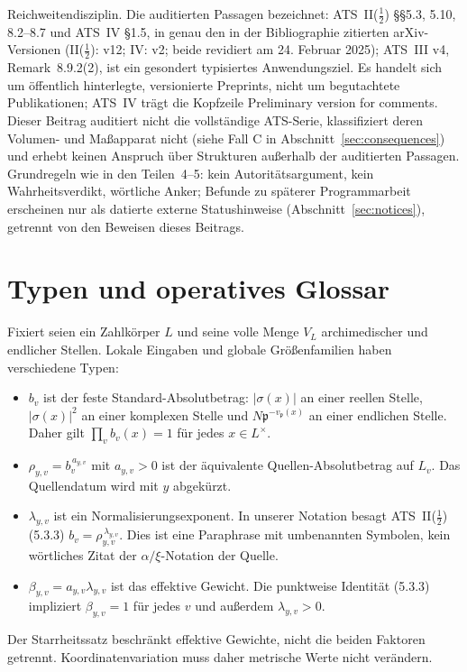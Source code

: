 \documentclass[11pt,a4paper]{article}
\theoremstyle{definition}
\theoremstyle{remark}
\begin{document}
Reichweitendisziplin. \glqq Die auditierten Passagen\grqq{} bezeichnet: ATS~II($\tfrac12$) \S\S5.3, 5.10, 8.2--8.7 und ATS~IV \S1.5, in genau den in der
Bibliographie zitierten arXiv-Versionen (II($\tfrac12$): v12; IV: v2; beide
revidiert am 24. Februar 2025); ATS~III v4, Remark~8.9.2(2), ist ein
gesondert typisiertes Anwendungsziel. Es handelt sich um öffentlich hinterlegte,
versionierte Preprints, nicht um begutachtete Publikationen; ATS~IV trägt die
Kopfzeile \glqq Preliminary version for comments\grqq{}. Dieser Beitrag auditiert nicht
die vollständige ATS-Serie, klassifiziert deren Volumen- und Maßapparat nicht
(siehe Fall C in Abschnitt~\ref{sec:consequences}) und erhebt keinen Anspruch
über Strukturen außerhalb der auditierten Passagen. Grundregeln wie in den
Teilen~4--5: kein Autoritätsargument, kein Wahrheitsverdikt, wörtliche Anker;
Befunde zu späterer Programmarbeit erscheinen nur als datierte externe
Statushinweise (Abschnitt~\ref{sec:notices}), getrennt von den Beweisen dieses
Beitrags.

\section{Typen und operatives Glossar}\label{sec:types}

Fixiert seien ein Zahlkörper $L$ und seine volle Menge $V_L$ archimedischer
und endlicher Stellen. Lokale Eingaben und globale Größenfamilien haben
verschiedene Typen:
\begin{itemize}
\item $b_v$ ist der feste Standard-Absolutbetrag: $|\sigma(x)|$ an einer
reellen Stelle, $|\sigma(x)|^2$ an einer komplexen Stelle und
$N\mathfrak p^{-v_{\mathfrak p}(x)}$ an einer endlichen Stelle. Daher gilt
$\prod_v b_v(x)=1$ für jedes $x\in L^\times$.
\item $\rho_{y,v}=b_v^{\,a_{y,v}}$ mit $a_{y,v}>0$ ist der äquivalente
Quellen-Absolutbetrag auf $L_v$. Das Quellendatum wird mit $y$ abgekürzt.
\item $\lambda_{y,v}$ ist ein Normalisierungsexponent. In unserer Notation
besagt ATS~II($\tfrac12$) (5.3.3) \cite{joshiIIhalf}
$b_v=\rho_{y,v}^{\,\lambda_{y,v}}$. Dies ist eine Paraphrase mit umbenannten
Symbolen, kein wörtliches Zitat der $\alpha/\xi$-Notation der Quelle.
\item $\beta_{y,v}=a_{y,v}\lambda_{y,v}$ ist das effektive Gewicht.
Die punktweise Identität (5.3.3) impliziert $\beta_{y,v}=1$ für jedes $v$
und außerdem $\lambda_{y,v}>0$.
\end{itemize}
Der Starrheitssatz beschränkt effektive Gewichte, nicht die beiden Faktoren
getrennt. Koordinatenvariation muss daher metrische Werte nicht verändern.
\end{document}
